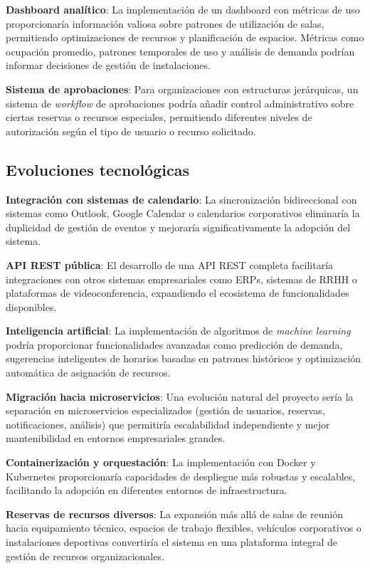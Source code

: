 \textbf{Dashboard analítico}: La implementación de un dashboard con métricas de uso proporcionaría información valiosa sobre patrones de utilización de salas, permitiendo optimizaciones de recursos y planificación de espacios. Métricas como ocupación promedio, patrones temporales de uso y análisis de demanda podrían informar decisiones de gestión de instalaciones.

\textbf{Sistema de aprobaciones}: Para organizaciones con estructuras jerárquicas, un sistema de \emph{workflow} de aprobaciones podría añadir control administrativo sobre ciertas reservas o recursos especiales, permitiendo diferentes niveles de autorización según el tipo de usuario o recurso solicitado.

\subsection{Evoluciones tecnológicas}\label{evoluciones-tecnologicas}
\textbf{Integración con sistemas de calendario}: La sincronización bidireccional con sistemas como Outlook, Google Calendar o calendarios corporativos eliminaría la duplicidad de gestión de eventos y mejoraría significativamente la adopción del sistema.

\textbf{API REST pública}: El desarrollo de una API REST completa facilitaría integraciones con otros sistemas empresariales como ERPs, sistemas de RRHH o plataformas de videoconferencia, expandiendo el ecosistema de funcionalidades disponibles.

\textbf{Inteligencia artificial}: La implementación de algoritmos de \emph{machine learning} podría proporcionar funcionalidades avanzadas como predicción de demanda, sugerencias inteligentes de horarios basadas en patrones históricos y optimización automática de asignación de recursos.

\textbf{Migración hacia microservicios}: Una evolución natural del proyecto sería la separación en microservicios especializados (gestión de usuarios, reservas, notificaciones, análisis) que permitiría escalabilidad independiente y mejor mantenibilidad en entornos empresariales grandes.

\textbf{Containerización y orquestación}: La implementación con Docker y Kubernetes proporcionaría capacidades de despliegue más robustas y escalables, facilitando la adopción en diferentes entornos de infraestructura.

\textbf{Reservas de recursos diversos}: La expansión más allá de salas de reunión hacia equipamiento técnico, espacios de trabajo flexibles, vehículos corporativos o instalaciones deportivas convertiría el sistema en una plataforma integral de gestión de recursos organizacionales.

